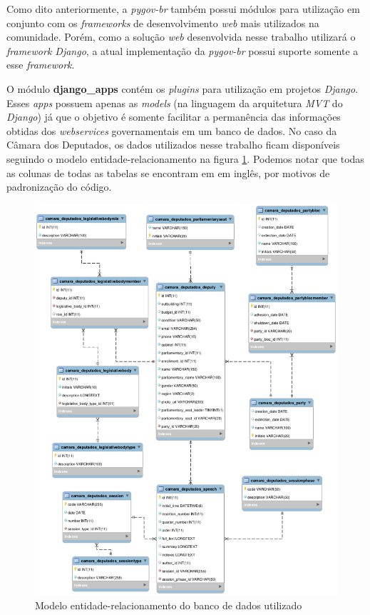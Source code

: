 Como dito anteriormente, a \textit{pygov-br} também possui módulos para utilização em conjunto com os \textit{frameworks} de desenvolvimento \textit{web} mais utilizados na comunidade. Porém, como a solução \textit{web} desenvolvida nesse trabalho utilizará o \textit{framework Django}, a atual implementação da \textit{pygov-br} possui suporte somente a esse \textit{framework}.

O módulo \textbf{django\_apps} contém os \textit{plugins} para utilização em projetos \textit{Django}. Esses \textit{apps} possuem apenas as \textit{models} (na linguagem da arquitetura \textit{MVT} do \textit{Django}) já que o objetivo é somente facilitar a permanência das informações obtidas dos \textit{webservices} governamentais em um banco de dados. No caso da Câmara dos Deputados, os dados utilizados nesse trabalho ficam disponíveis seguindo o modelo entidade-relacionamento na figura \ref{modelo-eer}. Podemos notar que todas as colunas de todas as tabelas se encontram em em inglês, por motivos de padronização do código.


\begin{figure}[h]
    \centering
    \includegraphics[scale=0.5]{figuras/pygov-eer.eps}
    \caption{Modelo entidade-relacionamento do banco de dados utilizado}
    \label{modelo-eer}
\end{figure}
